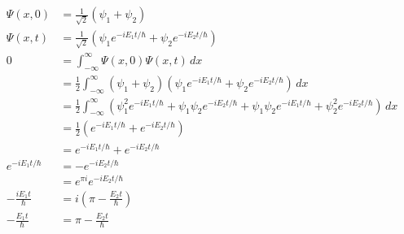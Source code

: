 \documentclass{article}
\begin{document}
\begin{align*}
  \Psi(x, 0)             & = \frac{1}{\sqrt{2}} (\psi_1 + \psi_2)                                                                                                                                              \\
  \Psi(x, t)             & = \frac{1}{\sqrt{2}} (\psi_1 e^{-i E_1 t / \hbar} + \psi_2 e^{-i E_2 t / \hbar})                                                                                                    \\
  0                      & = \int_{-\infty}^\infty \Psi(x, 0) \Psi(x, t) \,d x                                                                                                                                 \\
                         & = \frac{1}{2} \int_{-\infty}^\infty (\psi_1 + \psi_2) (\psi_1 e^{-i E_1 t / \hbar} + \psi_2 e^{-i E_2 t / \hbar}) \,d x                                                             \\
                         & = \frac{1}{2} \int_{-\infty}^\infty (\psi_1^2 e^{-i E_1 t / \hbar} + \psi_1 \psi_2 e^{-i E_2 t / \hbar} + \psi_1 \psi_2 e^{-i E_1 t / \hbar} + \psi_2^2 e^{-i E_2 t / \hbar}) \,d x \\
                         & = \frac{1}{2} (e^{-i E_1 t / \hbar} + e^{-i E_2 t / \hbar})                                                                                                                         \\
                         & = e^{-i E_1 t / \hbar} + e^{-i E_2 t / \hbar}                                                                                                                                       \\
  e^{-i E_1 t / \hbar}   & = -e^{-i E_2 t / \hbar}                                                                                                                                                             \\
                         & = e^{\pi i} e^{-i E_2 t / \hbar}                                                                                                                                                    \\
  -\frac{i E_1 t}{\hbar} & = i \left( \pi - \frac{E_2 t}{\hbar} \right)                                                                                                                                        \\
  -\frac{E_1 t}{\hbar}   & = \pi - \frac{E_2 t}{\hbar}                                                                                                                                                         \\

\end{align*}
\end{document}
